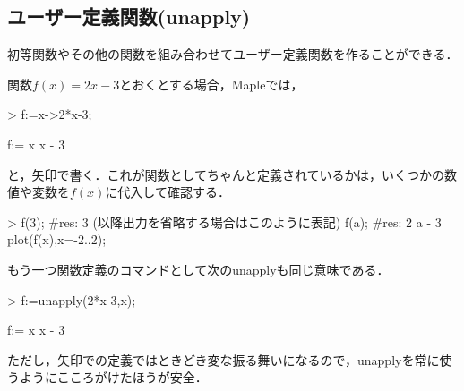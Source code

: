 \subsection{ユーザー定義関数(unapply)}
初等関数やその他の関数を組み合わせてユーザー定義関数を作ることができる．

関数$f(x) = 2 x - 3$とおくとする場合，Mapleでは，
\begin{MapleInput}
> f:=x->2*x-3;
\end{MapleInput}
\begin{MapleOutput}
f:= x  x - 3
\end{MapleOutput}
と，矢印で書く．これが関数としてちゃんと定義されているかは，いくつかの数値や変数を$f(x)$に代入して確認する．
\begin{MapleInput}
> f(3);               #res: 3 (以降出力を省略する場合はこのように表記)
  f(a);               #res: 2 a - 3
  plot(f(x),x=-2..2);
\end{MapleInput}
もう一つ関数定義のコマンドとして次のunapplyも同じ意味である．
\begin{MapleInput}
> f:=unapply(2*x-3,x);
\end{MapleInput}
\begin{MapleOutput}
f:= x  x - 3
\end{MapleOutput}
ただし，矢印での定義ではときどき変な振る舞いになるので，unapplyを常に使うようにこころがけたほうが安全．

